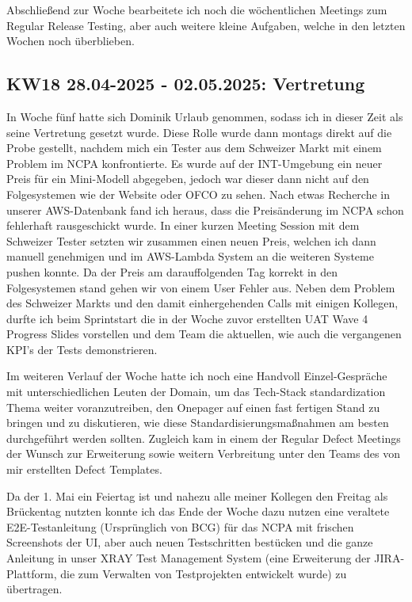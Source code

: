 Abschließend zur Woche bearbeitete ich noch die wöchentlichen Meetings zum Regular Release Testing, aber auch weitere kleine Aufgaben, welche in den letzten Wochen noch überblieben.


\subsection{KW18 28.04-2025 - 02.05.2025: Vertretung}
In Woche fünf hatte sich Dominik Urlaub genommen, sodass ich in dieser Zeit als seine Vertretung gesetzt wurde. 
Diese Rolle wurde dann montags direkt auf die Probe gestellt, nachdem mich ein Tester aus dem Schweizer Markt mit einem Problem im NCPA konfrontierte. 
Es wurde auf der INT-Umgebung ein neuer Preis für ein Mini-Modell abgegeben, jedoch war dieser dann nicht auf den Folgesystemen wie der Website oder OFCO zu sehen. 
Nach etwas Recherche in unserer AWS-Datenbank fand ich heraus, dass die Preisänderung im NCPA schon fehlerhaft rausgeschickt wurde. 
In einer kurzen Meeting Session mit dem Schweizer Tester setzten wir zusammen einen neuen Preis, welchen ich dann manuell genehmigen und im AWS-Lambda System an die weiteren Systeme pushen konnte. 
Da der Preis am darauffolgenden Tag korrekt in den Folgesystemen stand gehen wir von einem User Fehler aus. 
Neben dem Problem des Schweizer Markts und den damit einhergehenden Calls mit einigen Kollegen, durfte ich beim Sprintstart die in der Woche zuvor erstellten UAT Wave 4 Progress Slides vorstellen und dem Team die aktuellen, wie auch die vergangenen KPI’s der Tests demonstrieren.

Im weiteren Verlauf der Woche hatte ich noch eine Handvoll Einzel-Gespräche mit unterschiedlichen Leuten der Domain, um das Tech-Stack standardization Thema weiter voranzutreiben, den Onepager auf einen fast fertigen Stand zu bringen und zu diskutieren, wie diese Standardisierungsmaßnahmen am besten durchgeführt werden sollten. 
Zugleich kam in einem der Regular Defect Meetings der Wunsch zur Erweiterung sowie weitern Verbreitung unter den Teams des von mir erstellten Defect Templates.

Da der 1. Mai ein Feiertag ist und nahezu alle meiner Kollegen den Freitag als Brückentag nutzten konnte ich das Ende der Woche dazu nutzen eine veraltete E2E-Testanleitung (Ursprünglich von BCG) für das NCPA mit frischen Screenshots der UI, aber auch neuen Testschritten bestücken und die ganze Anleitung in unser XRAY Test Management System (eine Erweiterung der JIRA-Plattform, die zum Verwalten von Testprojekten entwickelt wurde) zu übertragen.

